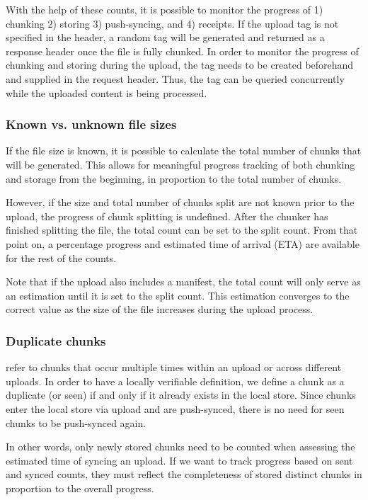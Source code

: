 With the help of these counts, it is possible to monitor the progress of 1) chunking 2) storing 3) push-syncing, and 4) receipts.
If the upload tag is not specified in the header, a random tag will be generated and returned as a response header once the file is fully chunked. In order to monitor the progress of chunking and storing during the upload, the tag needs to be created beforehand and supplied in the request header. Thus, the tag can be queried concurrently while the uploaded content is being processed. 

\subsubsection{Known vs. unknown file sizes}

If the file size is known, it is possible to calculate the total number of chunks that will be generated. This allows for meaningful progress tracking of both chunking and storage from the beginning, in proportion to the total number of chunks.

However, if the size and total number of chunks split are not known prior to the upload, the progress of chunk splitting is undefined. After the chunker has finished splitting the file, the total count can be set to the split count. From that point on, a percentage progress and estimated time of arrival (ETA) are available for the rest of the counts.

Note that if the upload also includes a manifest, the total count will only serve as an estimation until it is set to the split count. This estimation converges to the correct value as the size of the file increases during the upload process.


\subsubsection{Duplicate chunks}

 refer to chunks that occur multiple times within an upload or across different uploads. In order to have a locally verifiable definition, we define a chunk as a duplicate (or seen) if and only if it already exists in the local store.
Since chunks enter the local store via upload and are push-synced, there is no need for seen chunks to be push-synced again.

In other words, only newly stored chunks need to be counted when assessing the estimated time of syncing an upload. If we want to track progress based on sent and synced counts, they must reflect the completeness of stored distinct chunks in proportion to the overall progress.

